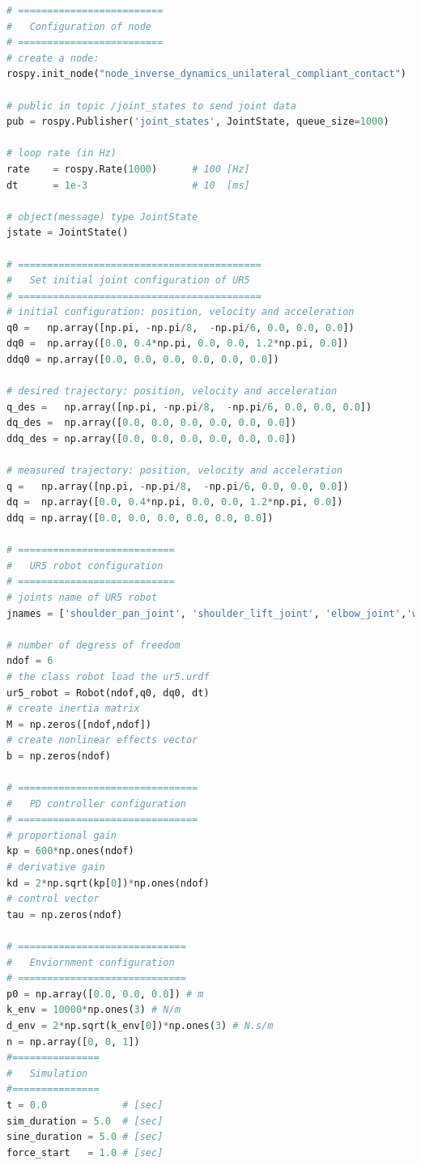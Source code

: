 \begin{lstlisting}[language=Python,caption={Move the second and fifth joint of UR5 robot with the required movement of activity 2.7.1.}, label={lst:inverse_dynamics_unilateral_compliant_contact}]
# =========================
#   Configuration of node
# =========================
# create a node: 
rospy.init_node("node_inverse_dynamics_unilateral_compliant_contact")

# public in topic /joint_states	to send joint data	
pub = rospy.Publisher('joint_states', JointState, queue_size=1000)

# loop rate (in Hz)
rate 	= rospy.Rate(1000)		# 100 [Hz]
dt 		= 1e-3					# 10  [ms]

# object(message) type JointState
jstate = JointState()

# ==========================================
#   Set initial joint configuration of UR5
# ==========================================
# initial configuration: position, velocity and acceleration 
q0 =   np.array([np.pi, -np.pi/8,  -np.pi/6, 0.0, 0.0, 0.0])
dq0 =  np.array([0.0, 0.4*np.pi, 0.0, 0.0, 1.2*np.pi, 0.0]) 
ddq0 = np.array([0.0, 0.0, 0.0, 0.0, 0.0, 0.0]) 

# desired trajectory: position, velocity and acceleration
q_des =   np.array([np.pi, -np.pi/8,  -np.pi/6, 0.0, 0.0, 0.0]) 
dq_des =  np.array([0.0, 0.0, 0.0, 0.0, 0.0, 0.0]) 
ddq_des = np.array([0.0, 0.0, 0.0, 0.0, 0.0, 0.0]) 

# measured trajectory: position, velocity and acceleration
q =   np.array([np.pi, -np.pi/8,  -np.pi/6, 0.0, 0.0, 0.0])
dq =  np.array([0.0, 0.4*np.pi, 0.0, 0.0, 1.2*np.pi, 0.0]) 
ddq = np.array([0.0, 0.0, 0.0, 0.0, 0.0, 0.0]) 

# ===========================
#   UR5 robot configuration
# ===========================
# joints name of UR5 robot
jnames = ['shoulder_pan_joint', 'shoulder_lift_joint', 'elbow_joint','wrist_1_joint', 'wrist_2_joint', 'wrist_3_joint']

# number of degress of freedom
ndof = 6
# the class robot load the ur5.urdf
ur5_robot = Robot(ndof,q0, dq0, dt)
# create inertia matrix 
M = np.zeros([ndof,ndof])
# create nonlinear effects vector
b = np.zeros(ndof)

# ===============================
#   PD controller configuration
# ===============================
# proportional gain
kp = 600*np.ones(ndof)
# derivative gain
kd = 2*np.sqrt(kp[0])*np.ones(ndof)
# control vector
tau = np.zeros(ndof) 

# =============================
#   Enviornment configuration
# =============================
p0 = np.array([0.0, 0.0, 0.0]) # m
k_env = 10000*np.ones(3) # N/m
d_env = 2*np.sqrt(k_env[0])*np.ones(3) # N.s/m
n = np.array([0, 0, 1])
#===============
#   Simulation
#===============
t = 0.0             # [sec] 
sim_duration = 5.0  # [sec]
sine_duration = 5.0 # [sec]
force_start   = 1.0 # [sec]



\end{lstlisting}
